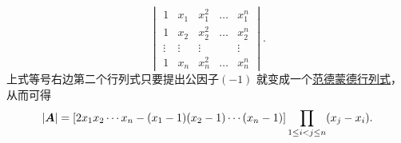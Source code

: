 \begin{example}
\begin{solution}
\begin{equation*}
\begin{vmatrix}
		1 & x_1 & x_1^2 & \dots & x_1^n \\
		1 & x_2 & x_2^2 & \dots & x_2^n \\
		\vdots & \vdots & \vdots & & \vdots \\
		1 & x_n & x_n^2 & \dots & x_n^n
	\end{vmatrix}.
\end{equation*}
上式等号右边第二个行列式只要提出公因子\((-1)\)
就变成一个\hyperref[equation:行列式.范德蒙德行列式]{范德蒙德行列式}，
从而可得\begin{equation*}
	\abs{\boldsymbol{A}}
	= \left[ 2 x_1 x_2 \dotsm x_n - (x_1 - 1)(x_2 - 1)\dotsm(x_n - 1) \right]
	\prod_{1 \leq i < j \leq n} (x_j - x_i).
\end{equation*}
\end{solution}
\end{example}

